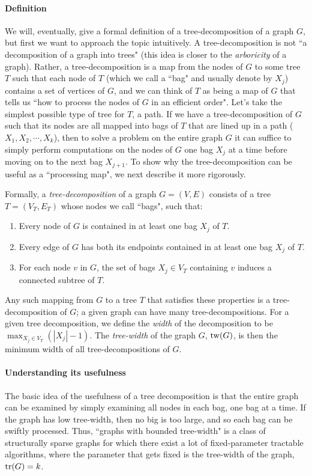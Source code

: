 \paragraph{Definition}
We will, eventually, give a formal definition of a tree-decomposition of a graph $G$, but first we want to approach the topic intuitively.
A tree-decomposition is not ``a decomposition of a graph into trees" (this idea is closer to the \emph{arboricity} of a graph). Rather, a tree-decomposition is a map from the nodes of $G$ to some tree $T$ such that each node of $T$ (which we call a ``bag" and usually denote by $X_j$) contains a set of vertices of $G$, and we can think of $T$ as being a map of $G$ that tells us ``how to process the nodes of $G$ in an efficient order". Let's take the simplest possible type of tree for $T$, a path. If we have a tree-decomposition of $G$ such that its nodes are all mapped into bags of $T$ that are lined up in a path ($X_1, X_2, \cdots, X_k$), then to solve a problem on the entire graph $G$ it can suffice to simply perform computations on the nodes of $G$ one bag $X_j$ at a time before moving on to the next bag $X_{j+1}$.
To show why the tree-decomposition can be useful as a ``processing map", we next describe it more rigorously.

Formally, a \emph{tree-decomposition} of a graph $G = (V,E)$ consists of a tree $T = (V_T,E_T)$ whose nodes we call ``bags", such that:
\begin{enumerate}[label=T.\arabic*]
  \item Every node of $G$ is contained in at least one bag $X_j$ of $T$.
  \item Every edge of $G$ has both its endpoints contained in at least one bag $X_j$ of $T$.
  \item\label{def:tree-decomp:bag-rule} For each node $v$ in $G$, the set of bags $X_{j} \in V_T$ containing $v$ induces a connected subtree of $T$.
\end{enumerate}

Any such mapping from $G$ to a tree $T$ that satisfies these properties is a tree-decomposition of $G$; a given graph can have many tree-decompositions. For a given tree decomposition, we define the \emph{width} of the decomposition to be $\max_{X_j \in V_T}  (|X_j| - 1 )$. The \emph{tree-width} of the graph $G$, $\operatorname{tw}(G)$, is then the minimum width of all tree-decompositions of $G$.

\paragraph{Understanding its usefulness}
The basic idea of the usefulness of a tree decomposition is that the entire graph can be examined by simply examining all nodes in each bag, one bag at a time. If the graph has low tree-width, then no big is too large, and so each bag can be swiftly processed. Thus, ``graphs with bounded tree-width" is a class of structurally sparse graphs for which there exist a lot of fixed-parameter tractable algorithms, where the parameter that gets fixed is the tree-width of the graph, $\operatorname{tr}(G) = k$.

